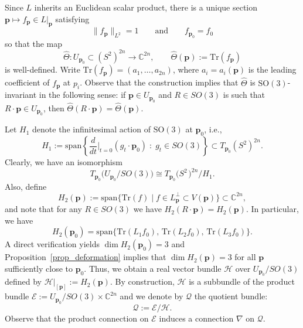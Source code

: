 \documentclass[11pt]{amsart}
\newcommand{\MH}{\mathcal{H}}
\newcommand{\MQ}{\mathcal{Q}}
\newcommand{\Tr}{\mathrm{Tr}}
\newcommand{\ME}{\mathcal{E}}
\newcommand{\SO}{\mathrm{SO}}
\newcommand{\mbp}{\mathbf{p}}
\newcommand{\Span}{\mathrm{span}}
\begin{document}
Since $L$ inherits an Euclidean scalar product, there is a unique section $\mbp\mapsto f_{\mbp}\in L|_{\mbp}$ satisfying
\[
\|f_{\mbp}\|_{L^2}=1\qquad \text{and}\qquad f_{\mbp_0}=f_0
\]
so that the map 
\begin{equation}
		\hat{\Theta}\colon U_{\mbp_0}\subset (S^2)^{2n} \longrightarrow \mathbb{C}^{2n},\qquad 
		\hat{\Theta}(\mbp):=\Tr(f_{\mbp})
\end{equation}
is well-defined. 
Write $\Tr(f_{\mbp})=(a_1,\ldots,a_{2n})$, where $a_i=a_i(\mbp)$ is the leading coefficient of $f_{\mbp}$ at $p_i$. Observe that the construction implies that $\hat\Theta$ is $\SO(3)$-invariant in the following sense: if $\mbp\in U_{\mbp_0}$ and $R\in SO(3)$ is such that $R\cdot\mbp\in U_{\mbp_0}$, then $\hat{\Theta}(R\cdot \mbp)=\hat{\Theta}(\mbp)$. 


Let  $H_1$ denote the infinitesimal action of $\SO(3)$ at $\mbp_0$, i.e.,
\begin{equation}
	H_1:=\Span\left\{\frac{d}{dt}\Big|_{t=0}(g_t\cdot \mbp_0)\;:\; g_t\in SO(3)\right\}
	\subset T_{\mbp_0}(S^2)^{2n}.
\end{equation}  
Clearly, we have an isomorphism
\[
T_{\mbp_0}\big (U_{\mbp_0}/SO(3) \big )\cong T_{\mbp_0}\big (S^{2\,} \big)^{2n}/H_1.
\]
Also, define
\[
H_2(\mbp):=\Span\big \{\Tr(f)\mid f\in L_{\mbp}^{\perp}\subset V(\mbp) \big \}\subset \mathbb C^{2n},
\]
and note that for any $R\in SO(3)$ we have $H_2(R\cdot \mbp)=H_2(\mbp)$. In particular, we have
\begin{equation}
	\label{Eq_SubspH2}
	H_2(\mbp_0)
	=\Span\{\Tr(L_1 f_0),\,\Tr(L_2 f_0),\,\Tr(L_3 f_0)\}.
\end{equation}
A direct verification yields $\dim H_2(\mbp_0)=3$ and Proposition~\ref{prop_deformation} implies that $\dim H_2(\mbp)=3$ for all $\mbp$ sufficiently close to $\mbp_0$.
Thus, we obtain a real vector bundle $\MH$ over $U_{\mbp_0}/SO(3)$ defined by $\MH|_{[\mbp]}:=H_2(\mbp)$. 
By construction, $\MH$ is a subbundle of the product bundle $\ME:=U_{\mbp_0}/SO(3)\times \mathbb{C}^{2n}$ and we denote by $\MQ$ the quotient bundle:
\[
\MQ:=\ME/\MH.
\]
Observe that the product connection on $\ME$ induces a connection $\nabla$ on  $\MQ$.
\end{document}
